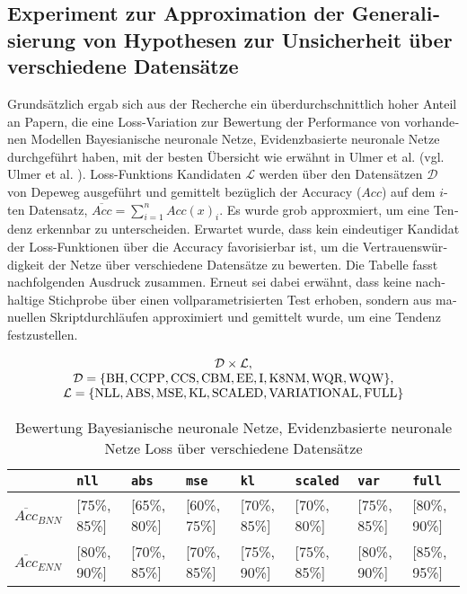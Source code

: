 \begin{otherlanguage}{ngerman}
\subsection*{Experiment zur Approximation der Generalisierung von Hypothesen zur Unsicherheit über verschiedene Datensätze}

Grundsätzlich ergab sich aus der Recherche ein überdurchschnittlich hoher Anteil an Papern, die eine Loss-Variation zur Bewertung der Performance von vorhandenen Modellen \gls{Bayesianische neuronale Netze}, \gls{Evidenzbasierte neuronale Netze} durchgeführt haben, mit der besten Übersicht wie erwähnt in Ulmer et al. (vgl. Ulmer et al. \parencite{Ulmer2023}). Loss-Funktions Kandidaten $\mathcal{L}$ werden über den Datensätzen $\mathcal{D}$ von Depeweg ausgeführt und gemittelt bezüglich der Accuracy ($Acc$) auf dem $i$-ten Datensatz, $\overline{Acc} = \sum_{i=1}^{n} Acc(x)_{i}$. Es wurde grob approxmiert, um eine Tendenz erkennbar zu unterscheiden. Erwartet wurde, dass kein eindeutiger Kandidat der Loss-Funktionen über die Accuracy favorisierbar ist, um die Vertrauenswürdigkeit der Netze über verschiedene Datensätze zu bewerten. Die Tabelle fasst nachfolgenden Ausdruck zusammen. Erneut sei dabei erwähnt, dass keine nachhaltige Stichprobe über einen vollparametrisierten Test erhoben, sondern aus manuellen Skriptdurchläufen approximiert und gemittelt wurde, um eine Tendenz festzustellen. 

\[
\begin{array}{c}
\mathcal{D} \times \mathcal{L}, \\
\vspace{0.15\baselineskip}
\noindent
\mathcal{D} = \{\text{BH}, \text{CCPP}, \text{CCS}, \text{CBM}, \text{EE}, \text{I}, \text{K8NM}, \text{WQR}, \text{WQW} \}, \\
\vspace{0.15\baselineskip}
\noindent
\mathcal{L} = \{\text{NLL}, \text{ABS}, \text{MSE}, \text{KL}, \text{SCALED}, \text{VARIATIONAL}, \text{FULL} \}
\end{array}
\]

\begin{table}[htbp]
\scriptsize
\renewcommand{\arraystretch}{1.5}
\begin{tabularx}{\textwidth}{|l|l|l|l|l|l|l|l|}
\hline
 & \texttt{nll} & \texttt{abs} & \texttt{mse} & \texttt{kl} & \texttt{scaled} & \texttt{var} & \texttt{full} \\
\hline
$\overline{Acc}_{BNN}$ & [75\%, 85\%] & [65\%, 80\%] & [60\%, 75\%] & [70\%, 85\%] & [70\%, 80\%] & [75\%, 85\%] & [80\%, 90\%] \\
\hline
$\overline{Acc}_{ENN}$ & [80\%, 90\%] & [70\%, 85\%] & [70\%, 85\%] & [75\%, 90\%] & [75\%, 85\%] & [80\%, 90\%] & [85\%, 95\%] \\
\hline
\end{tabularx}
\caption{Bewertung \gls{Bayesianische neuronale Netze}, \gls{Evidenzbasierte neuronale Netze} Loss über verschiedene Datensätze}
\end{table}


\end{otherlanguage}
